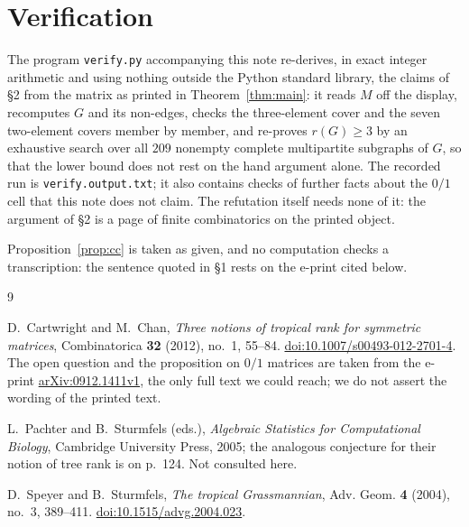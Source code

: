 \documentclass[11pt]{amsart}
\theoremstyle{remark}
\begin{document}
\section{Verification}

The program \texttt{verify.py} accompanying this note re-derives, in exact integer arithmetic
and using nothing outside the Python standard library, the claims of \S2 from the matrix as
printed in Theorem~\ref{thm:main}: it reads $M$ off the display, recomputes $G$ and its
non-edges, checks the three-element cover and the seven two-element covers member by member,
and re-proves $r(G)\ge3$ by an exhaustive search over all $209$ nonempty complete multipartite
subgraphs of $G$, so that the lower bound does not rest on the hand argument alone. The recorded
run is \texttt{verify.output.txt}; it also contains checks of further facts about the $0/1$ cell
that this note does not claim. The refutation itself needs none of it: the argument of \S2 is a
page of finite combinatorics on the printed object.

Proposition~\ref{prop:cc} is taken as given, and no computation checks a transcription: the
sentence quoted in \S1 rests on the e-print cited below.

\begin{thebibliography}{9}

D.~Cartwright and M.~Chan,
\emph{Three notions of tropical rank for symmetric matrices},
Combinatorica \textbf{32} (2012), no.~1, 55--84.
\href{https://doi.org/10.1007/s00493-012-2701-4}{doi:10.1007/s00493-012-2701-4}.
The open question and the proposition on $0/1$ matrices are taken from the e-print
\href{https://arxiv.org/abs/0912.1411v1}{arXiv:0912.1411v1}, the only full text we could
reach; we do not assert the wording of the printed text.

L.~Pachter and B.~Sturmfels (eds.),
\emph{Algebraic Statistics for Computational Biology},
Cambridge University Press, 2005; the analogous conjecture for their notion of tree rank is on
p.~124. Not consulted here.

D.~Speyer and B.~Sturmfels,
\emph{The tropical Grassmannian},
Adv. Geom. \textbf{4} (2004), no.~3, 389--411.
\href{https://doi.org/10.1515/advg.2004.023}{doi:10.1515/advg.2004.023}.

\end{thebibliography}
\end{document}
